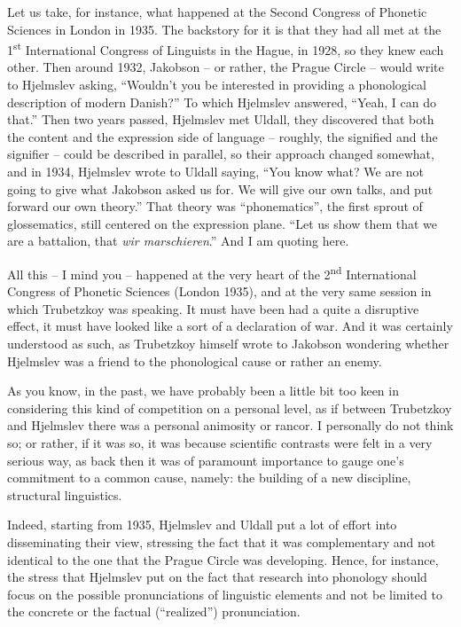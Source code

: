 \begin{styleStandard}
Let us take, for instance, what happened at the Second Congress of Phonetic Sciences in London in 1935. The backstory for it is that they had all met at the 1\textsuperscript{st} International Congress of Linguists in the Hague, in 1928, so they knew each other. Then around 1932, Jakobson – or rather, the Prague Circle – would write to Hjelmslev asking, “Wouldn’t you be interested in providing a phonological description of modern Danish?” To which Hjelmslev answered, “Yeah, I can do that.” Then two years passed, Hjelmslev met Uldall, they discovered that both the content and the expression side of language – roughly, the signified and the signifier – could be described in parallel, so their approach changed somewhat, and in 1934, Hjelmslev wrote to Uldall saying, “You know what? We are not going to give what Jakobson asked us for. We will give our own talks, and put forward our own theory.” That theory was “phonematics”, the first sprout of glossematics, still centered on the expression plane. “Let us show them that we are a battalion, that \textit{wir marschieren}.” And I am quoting here. 
\end{styleStandard}

\begin{styleStandard}
All this – I mind you – happened at the very heart of the 2\textsuperscript{nd} International Congress of Phonetic Sciences (London 1935), and at the very same session in which Trubetzkoy was speaking. It must have been had a quite a disruptive effect, it must have looked like a sort of a declaration of war. And it was certainly understood as such, as Trubetzkoy himself wrote to Jakobson wondering whether Hjelmslev was a friend to the phonological cause or rather an enemy. 
\end{styleStandard}

\begin{styleStandard}
As you know, in the past, we have probably been a little bit too keen in considering this kind of competition on a personal level, as if between Trubetzkoy and Hjelmslev there was a personal animosity or rancor. I personally do not think so; or rather, if it was so, it was because scientific contrasts were felt in a very serious way, as back then it was of paramount importance to gauge one’s commitment to a common cause, namely: the building of a new discipline, structural linguistics. 
\end{styleStandard}

\begin{styleStandard}
Indeed, starting from 1935, Hjelmslev and Uldall put a lot of effort into disseminating their view, stressing the fact that it was complementary and not identical to the one that the Prague Circle was developing. Hence, for instance, the stress that Hjelmslev put on the fact that research into phonology should focus on the possible pronunciations of linguistic elements and not be limited to the concrete or the factual (“realized”) pronunciation. 
\end{styleStandard}

